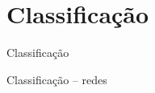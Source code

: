 
\section{Classificação}

\begin{frame}{Classificação}
    
\end{frame}

\begin{frame}{Classificação -- redes}
    
\end{frame}
